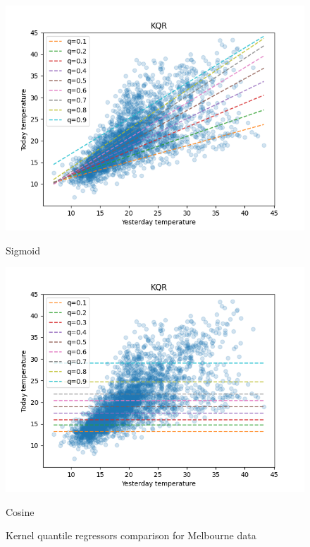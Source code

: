 \begin{figure}[ht]
\begin{minipage}[b]{0.5\linewidth}
      \vspace{4ex}
    \end{minipage}%
    \begin{minipage}[b]{0.5\linewidth}
      \centering
      \includegraphics[width=1.0\textwidth]{images/melbourne_sigmoid_kernel_quantile_regression.png}
        \caption{Sigmoid} 
      \vspace{4ex}
    \end{minipage} 
    \begin{minipage}[b]{0.5\linewidth}
        \centering
        \includegraphics[width=1.0\textwidth]{images/melbourne_cosine_kernel_quantile_regression.png}
        \caption{Cosine}  
        \vspace{4ex}
      \end{minipage}%
      \caption{Kernel quantile regressors comparison for Melbourne data}
      \label{fig:kernel quantile regressors comparison2}
  \end{figure}
% 

